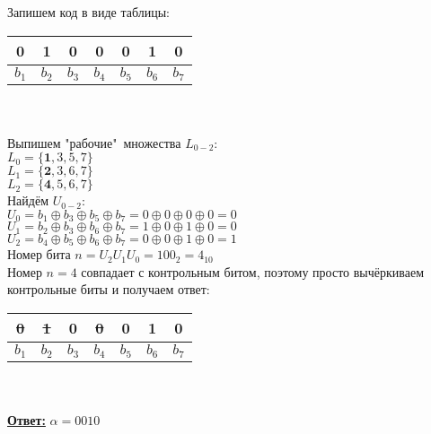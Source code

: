 Запишем код в виде таблицы:

\begin{tabular}{|c|c|c|c|c|c|c|}
    \hline
    \textbf{0} & \textbf{1} & 0 & \textbf{0} & 0 & 1 & 0 \\
    \hline
    $ b_{1} $ & $ b_{2} $ & $ b_{3} $ & $ b_{4} $ & $ b_{5} $ & $ b_{6} $ & $ b_{7} $\\
    \hline
\end{tabular}
\\
\\

Выпишем "рабочие"\ множества $ L_{0-2} $:\\

$ L_0 = \{\textbf{1}, 3, 5, 7\} $\\

$ L_1 = \{\textbf{2}, 3, 6, 7\} $\\

$ L_2 = \{\textbf{4}, 5, 6, 7\} $\\

Найдём $ U_{0-2} $:\\

$ U_0 = b_1 \oplus b_3 \oplus b_5 \oplus b_7 = 
0 \oplus 0 \oplus 0 \oplus 0 = 0$\\
 
$ U_1 = b_2 \oplus b_3 \oplus b_6 \oplus b_7 = 
1 \oplus 0 \oplus 1 \oplus 0 = 0$\\

$ U_2 = b_4 \oplus b_5 \oplus b_6 \oplus b_7 =
0 \oplus 0 \oplus 1 \oplus 0 = 1$\\

Номер бита $ n = U_2 U_1 U_0 = 100_2 = 4_{10} $\\

Номер $ n = 4 $ совпадает с контрольным битом, поэтому просто вычёркиваем контрольные биты и получаем ответ:\\

\begin{tabular}{|c|c|c|c|c|c|c|}
    \hline
    \sout{0} & \sout{1} & 0 & \textbf{\sout{0}} & 0 & 1 & 0 \\
    \hline
    $ b_{1} $ & $ b_{2} $ & $ b_{3} $ & $ b_{4} $ & $ b_{5} $ & $ b_{6} $ & $ b_{7} $\\
    \hline
\end{tabular}
\\
\\

\textbf{\underline{Ответ:}} 
$ \alpha = 0010 $